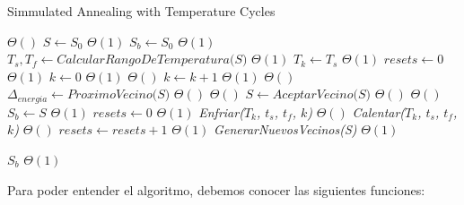 \begin{algorithm}[H]
\caption{Simmulated Annealing with Temperature Cycles}
\begin{algorithmic}[1]
 \Comment $\Theta()$
\State $S \gets S_0$ \Comment $\Theta(1)$
\State $S_b \gets S_0$ \Comment $\Theta(1)$
\State $T_s, T_f  \gets \textit{CalcularRangoDeTemperatura(S)}$ \Comment $\Theta(1)$
\State $T_k \gets T_{s}$ \Comment $\Theta(1)$
\State $resets \gets 0$ \Comment $\Theta(1)$
\State $k \gets 0$ \Comment $\Theta(1)$
\State
{} \Comment $\Theta()$
	\State $k \gets k + 1$ \Comment $\Theta(1)$
	\State
	 \Comment $\Theta()$
		\State $\Delta_{energia} \gets \textit{ProximoVecino(S)}$ \Comment $\Theta()$
		 \Comment $\Theta()$
			\State $S \gets \textit{AceptarVecino(S)}$ \Comment $\Theta()$
		\EndIf
		 \Comment $\Theta()$
			\State $S_b \gets S$ \Comment $\Theta(1)$
			\State $resets \gets 0$ \Comment $\Theta(1)$
		\EndIf	
		\State \textit{Enfriar($T_k$, $t_s$, $t_f$, $k$)} \Comment $\Theta()$		
		\State
	\Else
		\State \textit{Calentar($T_k$, $t_s$, $t_f$, $k$)} \Comment $\Theta()$			
		\State $resets \gets resets + 1$ \Comment $\Theta(1)$
		\State \textit{GenerarNuevosVecinos(S)} \Comment $\Theta(1)$
	\EndIf

\EndWhile
\State
\State \Return $S_b$ \Comment $\Theta(1)$
\EndFunction
\end{algorithmic}
\end{algorithm}

Para poder entender el algoritmo, debemos conocer las siguientes funciones:

